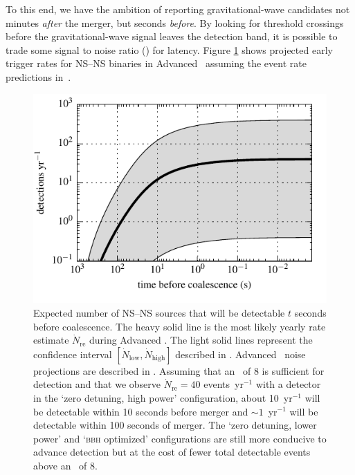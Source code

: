To this end, we have the ambition of reporting gravitational-wave candidates not minutes
\emph{after} the merger, but seconds \emph{before}.  By
looking for threshold crossings before the gravitational-wave signal leaves
the detection band, it is possible to trade some signal to noise ratio (\SNR{})
for latency.  Figure \ref{fig:earlywarning} shows projected early trigger rates
for NS--NS binaries in Advanced \LIGO\ assuming the event rate predictions
in~\cite{Abadie:2010p10836}.
%
\begin{figure}
\begin{center}
\includegraphics{figures/snr_in_time.pdf}
\caption{\label{fig:earlywarning} Expected number of NS--NS sources that will
be detectable $t$ seconds before coalescence.  The heavy solid line is the most
likely yearly rate estimate $\dot N_{\mathrm{re}}$ during Advanced \LIGO.  The
light solid lines represent the confidence interval $[\dot N_{\mathrm{low}}, \dot 
N_{\mathrm{high}}]$ described in
\cite{Abadie:2010p10836}.  Advanced \LIGO\ noise projections are described in 
\cite{ALIGONoise}.  Assuming that an \SNR\ of 8 is sufficient for
detection and that we observe $\dot N_{\mathrm{re}} = 40$ events~yr$^{-1}$ with a
detector in the `zero detuning, high power' configuration, about 10~yr$^{-1}$ will be 
detectable within 10 seconds before merger and $\sim1$~yr$^{-1}$ will be detectable 
within 100 seconds of merger.  The `zero detuning, lower power' and `\textsc{bbh} optimized' configurations are still more conducive to advance detection
but at the cost of fewer total detectable events above an \SNR\ of 8.}
\end{center}
\end{figure}

